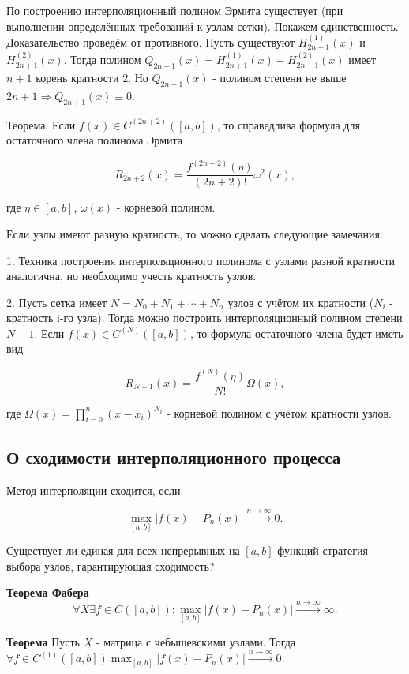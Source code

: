 По построению интерполяционный полином Эрмита существует (при выполнении определённых требований к узлам сетки). Покажем единственность.  
Доказательство проведём от противного. Пусть существуют \( H_{2n+1}^{(1)}(x) \) и  
\( H_{2n+1}^{(2)}(x) \). Тогда полином \( Q_{2n+1}(x) = H_{2n+1}^{(1)}(x) - H_{2n+1}^{(2)}(x) \) имеет \( n + 1 \) корень кратности 2. Но \( Q_{2n+1}(x) \) - полином степени не выше \( 2n + 1 \Rightarrow Q_{2n+1}(x) \equiv 0 \).

Теорема. Если \( f(x) \in C^{(2n+2)}([a, b]) \), то справедлива формула для остаточного члена полинома Эрмита

$$R_{2n+2}(x) = \frac{f^{(2n+2)}(\eta)}{(2n+2)!} \omega^2(x),$$

где \( \eta \in [a, b] \), \( \omega(x) \) - корневой полином.

\dotfill

Если узлы имеют разную кратность, то можно сделать следующие замечания:

1. Техника построения интерполяционного полинома с узлами разной кратности аналогична, но необходимо учесть кратность узлов.

2. Пусть сетка имеет \( N = N_0 + N_1 + \cdots + N_n \) узлов с учётом их кратности (\( N_i \) - кратность i-го узла). Тогда можно построить интерполяционный полином степени \( N-1 \). Если \( f(x) \in C^{(N)}([a,b]) \), то формула остаточного члена будет иметь вид

$$R_{N-1}(x) = \frac{f^{(N)}(\eta)}{N!} \Omega(x),$$

где \( \Omega(x) = \prod_{i=0}^n (x - x_i)^{N_i} \) - корневой полином с учётом кратности узлов.

\subsection{О сходимости интерполяционного процесса}

Метод интерполяции сходится, если

$$\max_{[a,b]} |f(x) - P_n(x)| \xrightarrow{n \to \infty} 0.$$

Существует ли единая для всех непрерывных на \([a, b]\) функций стратегия выбора узлов, гарантирующая сходимость?

\textbf{Теорема Фабера}
$$\forall X \exists f \in C([a, b]): \max_{[a,b]} |f(x) - P_n(x)| \xrightarrow{n \to \infty} \infty.$$

\textbf{Теорема}
Пусть \(X\) - матрица с чебышевскими узлами. Тогда \(\forall f \in C^{(1)}([a, b]) \max_{[a,b]} |f(x) - P_n(x)| \xrightarrow{n \to \infty} 0.\)


